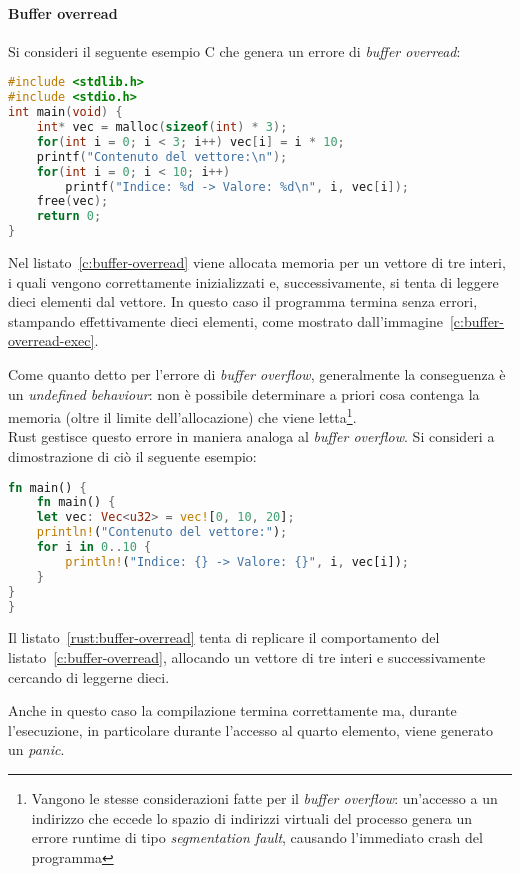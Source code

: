\paragraph{Buffer overread}
Si consideri il seguente esempio C che genera un errore di \textit{buffer overread}:
\begin{lstlisting}[language=C, caption={Buffer overread in C}, label={c:buffer-overread}]
#include <stdlib.h>
#include <stdio.h>
int main(void) {
    int* vec = malloc(sizeof(int) * 3);
    for(int i = 0; i < 3; i++) vec[i] = i * 10;
    printf("Contenuto del vettore:\n");
    for(int i = 0; i < 10; i++)
        printf("Indice: %d -> Valore: %d\n", i, vec[i]);
    free(vec);
    return 0;
}
\end{lstlisting}
Nel listato~\ref{c:buffer-overread} viene allocata memoria per un vettore di tre interi, i quali vengono correttamente inizializzati e, successivamente,
si tenta di leggere dieci elementi dal vettore.
In questo caso il programma termina senza errori, stampando effettivamente dieci elementi, come mostrato dall'immagine~\ref{c:buffer-overread-exec}. 

Come quanto detto per l'errore di \textit{buffer overflow}, generalmente la conseguenza è un \textit{undefined behaviour}: 
non è possibile determinare a priori cosa contenga la memoria (oltre
il limite dell'allocazione) che viene letta\footnote{Vangono le stesse considerazioni fatte per il \textit{buffer overflow}: un'accesso a un indirizzo
che eccede lo spazio di indirizzi virtuali del processo genera un errore runtime di tipo \textit{segmentation fault}, causando l'immediato crash del programma}.\hfill
\vspace{10pt}\\
\noindent Rust gestisce questo errore in maniera analoga al \textit{buffer overflow}. Si consideri a dimostrazione di ciò il seguente esempio:
\begin{lstlisting}[language=Rust, caption={Buffer overread in Rust}, label={rust:buffer-overread}]
fn main() {
    fn main() {
    let vec: Vec<u32> = vec![0, 10, 20];
    println!("Contenuto del vettore:");
    for i in 0..10 {
        println!("Indice: {} -> Valore: {}", i, vec[i]);
    }
}
}
\end{lstlisting}
Il listato~\ref{rust:buffer-overread} tenta di replicare il comportamento del listato~\ref{c:buffer-overread}, 
allocando un vettore di tre interi e successivamente cercando di leggerne dieci. 

Anche in questo caso la compilazione termina correttamente ma, durante l'esecuzione, in particolare durante l'accesso al quarto elemento, viene generato
un \textit{panic}. 


